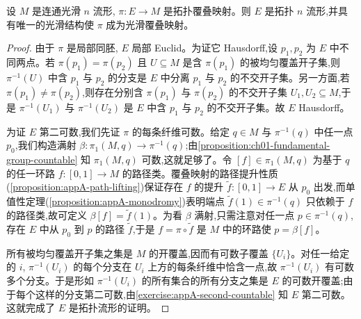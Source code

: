 \documentclass[../../main.tex]{subfiles}
\begin{document}
\begin{proposition}\label{proposition:ch04-covering-smooth}
设 $M$ 是连通光滑 $n$ 流形, $\pi:E\to M$ 是拓扑覆叠映射。则 $E$ 是拓扑 $n$ 流形,并具有唯一的光滑结构使 $\pi$ 成为光滑覆叠映射。
\end{proposition}

\begin{proof}
由于 $\pi$ 是局部同胚, $E$ 局部 Euclid。为证它 Hausdorff,设 $p_1,p_2$ 为 $E$ 中不同两点。若 $\pi(p_1)=\pi(p_2)$ 且 $U\subseteq M$ 是含 $\pi(p_1)$ 的被均匀覆盖开子集,则 $\pi^{-1}(U)$ 中含 $p_1$ 与 $p_2$ 的分支是 $E$ 中分离 $p_1$ 与 $p_2$ 的不交开子集。另一方面,若 $\pi(p_1)\neq\pi(p_2)$,则存在分别含 $\pi(p_1)$ 与 $\pi(p_2)$ 的不交开子集 $U_1,U_2\subseteq M$,于是 $\pi^{-1}(U_1)$ 与 $\pi^{-1}(U_2)$ 是 $E$ 中含 $p_1$ 与 $p_2$ 的不交开子集。故 $E$ Hausdorff。

为证 $E$ 第二可数,我们先证 $\pi$ 的每条纤维可数。给定 $q\in M$ 与 $\pi^{-1}(q)$ 中任一点 $p_0$,我们构造满射 $\beta:\pi_1(M,q)\to\pi^{-1}(q)$;由\cref{proposition:ch01-fundamental-group-countable} 知 $\pi_1(M,q)$ 可数,这就足够了。令 $[f]\in\pi_1(M,q)$ 为基于 $q$ 的任一环路 $f:[0,1]\to M$ 的路径类。覆叠映射的路径提升性质(\cref{proposition:appA-path-lifting})保证存在 $f$ 的提升 $\widetilde{f}:[0,1]\to E$ 从 $p_0$ 出发,而单值性定理(\cref{proposition:appA-monodromy})表明端点 $\widetilde{f}(1)\in\pi^{-1}(q)$ 只依赖于 $f$ 的路径类,故可定义 $\beta[f]=\widetilde{f}(1)$。为看 $\beta$ 满射,只需注意对任一点 $p\in\pi^{-1}(q)$,存在 $E$ 中从 $p_0$ 到 $p$ 的路径 $\widetilde{f}$,于是 $f=\pi\circ\widetilde{f}$ 是 $M$ 中的环路使 $p=\beta[f]$。

所有被均匀覆盖开子集之集是 $M$ 的开覆盖,因而有可数子覆盖 $\{U_i\}$。对任一给定的 $i$, $\pi^{-1}(U_i)$ 的每个分支在 $U_i$ 上方的每条纤维中恰含一点,故 $\pi^{-1}(U_i)$ 有可数多个分支。于是形如 $\pi^{-1}(U_i)$ 的所有集合的所有分支之集是 $E$ 的可数开覆盖;由于每个这样的分支第二可数,由\cref{exercise:appA-second-countable} 知 $E$ 第二可数。这就完成了 $E$ 是拓扑流形的证明。


\end{proof}
\end{document}
